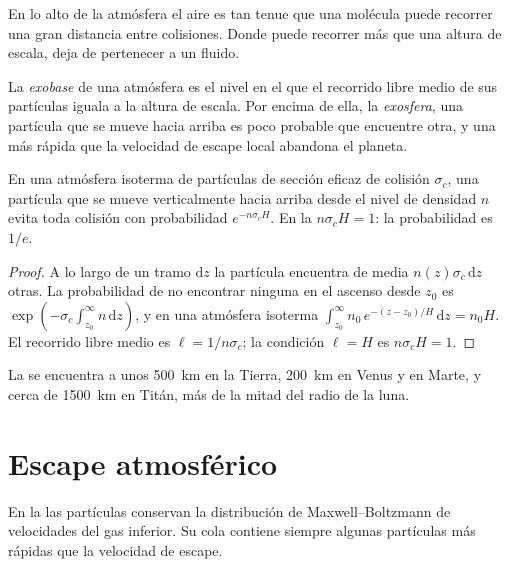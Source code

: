 En lo alto de la atmósfera el aire es tan tenue que una molécula puede recorrer
una gran distancia entre colisiones. Donde puede recorrer más que una altura de escala, deja de
pertenecer a un fluido.

\begin{definition}\label{def:b3:planetary-atmospheres:exobase}
La \emph{exobase} de una atmósfera es el nivel en el que
el recorrido libre medio de sus partículas iguala a la altura de escala. Por encima de ella,
la \emph{exosfera}, una partícula que se mueve hacia arriba es
poco probable que encuentre otra, y una más rápida que la velocidad de escape local
abandona el planeta.
\end{definition}

\begin{proposition}\label{prop:b3:planetary-atmospheres:exobase}
En una atmósfera isoterma de partículas de sección eficaz de colisión
$\sigma_c$, una partícula que se mueve verticalmente hacia arriba desde el nivel de densidad
$n$ evita toda colisión con probabilidad $e^{-n\sigma_c H}$. En la
 $n\sigma_c H = 1$: la probabilidad es $1/e$.
\end{proposition}

\begin{proof}
A lo largo de un tramo $\mathrm dz$ la partícula encuentra de media $n(z)\sigma_c\,
\mathrm dz$ otras. La probabilidad de no encontrar ninguna en el ascenso desde
$z_0$ es $\exp(-\sigma_c\int_{z_0}^\infty n\,\mathrm dz)$, y en una
atmósfera isoterma $\int_{z_0}^\infty n_0\,e^{-(z-z_0)/H}\,\mathrm dz
= n_0 H$. El recorrido libre medio es $\ell = 1/n\sigma_c$; la condición $\ell
= H$ es $n\sigma_c H = 1$.
\end{proof}

La  se encuentra a unos \qty{500}{km} en la Tierra, \qty{200}{km} en
Venus y en Marte, y cerca de \qty{1500}{km} en Titán, más de la mitad del
radio de la luna.

\section{Escape atmosférico}\label{sec:b3:planetary-atmospheres:escape}

En la  las partículas conservan la distribución de Maxwell--Boltzmann de
velocidades del gas inferior. Su cola contiene siempre algunas partículas más rápidas que
la velocidad de escape.

